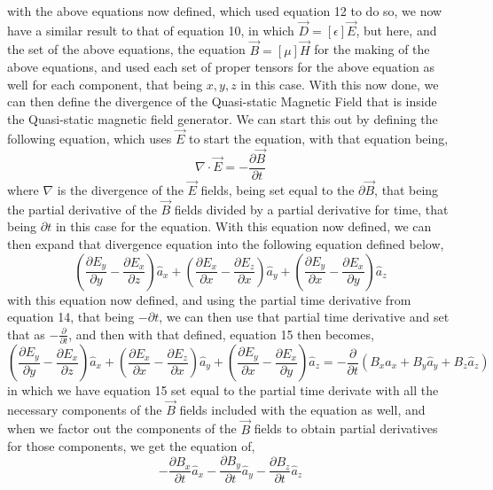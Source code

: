 \documentclass[]{article}
\begin{document}
with the above equations now defined, which used equation 12 to do so, we now have a similar result to that of equation 10, in which $\vec{D} = [\epsilon]\vec{E}$, but here, and the set of the above equations, the equation $\vec{B} = [\mu]\vec{H}$ for the making of the above equations, and used each set of proper tensors for the above equation as well for each component, that being $x,y,z$ in this case. With this now done, we can then define the divergence of the Quasi-static Magnetic Field that is inside the Quasi-static magnetic field generator. We can start this out by defining the following equation, which uses $\vec{E}$ to start the equation, with that equation being,
\begin{equation}
\nabla \cdot \vec{E} = -\frac{\partial{\vec{B}}}{\partial{t}}
\end{equation}
where $\nabla$ is the divergence of the $\vec{E}$ fields, being set equal to the $\partial{\vec{B}}$, that being the partial derivative of the $\vec{B}$ fields divided by a partial derivative for time, that being $\partial{t}$ in this case for the equation. With this equation now defined, we can then expand that divergence equation into the following equation defined below,
\begin{equation}
(\frac{\partial{E}_y}{\partial{y}} - \frac{\partial{E}_x}{\partial{z}})\hat{a}_x + (\frac{\partial{E}_x}{\partial{x}} - \frac{\partial{E}_z}{\partial{x}}) \hat{a}_y + (\frac{\partial{E}_y}{\partial{x}} - \frac{\partial{E}_x}{\partial{y}})\hat{a}_z
\end{equation}
with this equation now defined, and using the partial time derivative from equation 14, that being $-\partial{t}$, we can then use that partial time derivative and set that as $-\frac{\partial}{\partial{t}}$, and then with that defined, equation 15 then becomes,
\[(\frac{\partial{E}_y}{\partial{y}} - \frac{\partial{E}_x}{\partial{z}})\hat{a}_x + (\frac{\partial{E}_x}{\partial{x}} - \frac{\partial{E}_z}{\partial{x}}) \hat{a}_y + (\frac{\partial{E}_y}{\partial{x}} - \frac{\partial{E}_x}{\partial{y}})\hat{a}_z = -\frac{\partial}{\partial{t}}(B_x\hat{a}_x+B_y\hat{a}_y +B_z\hat{a}_z)\]
in which we have equation 15 set equal to the partial time derivate with all the necessary components of the $\vec{B}$ fields included with the equation as well, and when we factor out the components of the $\vec{B}$ fields to obtain partial derivatives for those components, we get the equation of,
\begin{equation}
-\frac{\partial{B}_x}{\partial{t}}\hat{a}_x - \frac{\partial{B}_y}{\partial{t}}\hat{a}_y - \frac{\partial{B}_z}{\partial{t}}\hat{a}_z
\end{equation}
\end{document}
